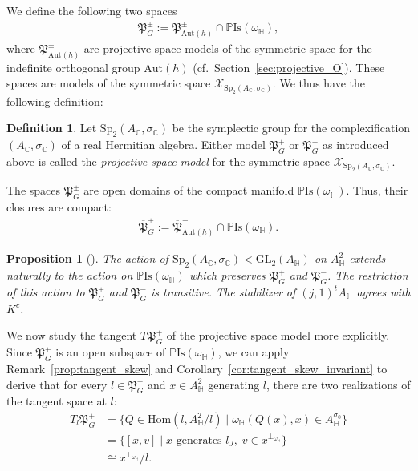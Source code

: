 \documentclass[oneside,11pt]{amsart}
\newtheorem{prop}[thm]{Proposition}
\theoremstyle{definition}
\newtheorem{defn}[thm]{Definition}
\theoremstyle{remark}
\numberwithin{thm}{section}
\numberwithin{equation}{section}
\begin{document}
We define the following two spaces 
\begin{align*}
    \mathfrak{P}_G^\pm:={{\mathfrak{P}}_{\mathrm{Aut}(h)}^\pm}\cap \mathbb{P}\mathrm{Is}\left( {{\omega }_{\mathbb{H}}} \right),
\end{align*}
where $\mathfrak{P}_{\mathrm{Aut}(h)}^\pm$ are projective space models of the symmetric space for the indefinite orthogonal group $\mathrm{Aut}(h)$ (cf.~Section~\ref{sec:projective_O}). These spaces are models of the symmetric space $\mathcal{X}_{\mathrm{Sp}_{2}(A_{\mathbb{C}},\sigma_{\mathbb{C}})}$. We thus have the following definition:

\begin{defn}\label{proj_model_complex}
Let $\mathrm{Sp}_{2}(A_{\mathbb{C}},\sigma_{\mathbb{C}})$ be the symplectic group for the complexification $(A_{\mathbb{C}},\sigma_{\mathbb{C}})$ of a real Hermitian algebra. Either model $\mathfrak{P}_G^+$ or $\mathfrak{P}_G^-$ as introduced above is called the \emph{projective space model} for the symmetric space $\mathcal{X}_{\mathrm{Sp}_{2}(A_{\mathbb{C}},\sigma_{\mathbb{C}})}$.
\end{defn}

The spaces $\mathfrak{P}_G^\pm$ are open domains of the compact manifold $\mathbb P\mathrm{Is}(\omega_\mathbb H)$. Thus, their closures are compact:
\begin{align*}
    \overline{\mathfrak{P}}_G^\pm:={\overline{\mathfrak{P}}_{\mathrm{Aut}(h)}^\pm}\cap \mathbb{P}\mathrm{Is}\left( {{\omega }_{\mathbb{H}}} \right).
\end{align*}


\begin{prop}[{\cite[Proposition~5.18]{ABRRW}}]
    The action of $\mathrm{Sp}_2(A_\mathbb C,\sigma_\mathbb C)<\mathrm{GL}_2(A_\mathbb H)$ on $A_\mathbb H^2$ extends naturally to the action on $\mathbb{P}\mathrm{Is}(\omega_\mathbb{H})$ which preserves $\mathfrak{P}_G^+$ and $\mathfrak{P}_G^-$. The restriction of this action to $\mathfrak{P}_G^+$ and $\mathfrak{P}_G^-$ is transitive. The stabilizer of $(j,1)^tA_\mathbb H$ agrees with $K^c$.
\end{prop}

We now study the tangent $T\mathfrak{P}_G^+$ of the projective space model more explicitly. Since $\mathfrak{P}_G^+$ is an open subspace of $\mathbb P\mathrm{Is}\left( {{\omega }_{\mathbb{H}}} \right)$, we can apply Remark~\ref{prop:tangent_skew} and Corollary~\ref{cor:tangent_skew_invariant} to derive that for every $l\in \mathfrak{P}_G^+$ and $x\in A_\mathbb H^2$ generating $l$, there are two realizations of the tangent space at $l$:
\begin{align*}
    T_{l}\mathfrak{P}_G^+
&=\{Q\in\mathrm{Hom}(l,A_\mathbb H^2/l)\mid \omega_\mathbb H(Q(x),x)\in A^{\sigma_0}_\mathbb H\}\\
&=\{[x,v]\mid x\text{ generates }l_J,\;v\in x^{\perp_{\omega_\mathbb H}}\}\\
&\cong x^{\perp_{\omega_\mathbb H}}/l.
\end{align*}
\end{document}
